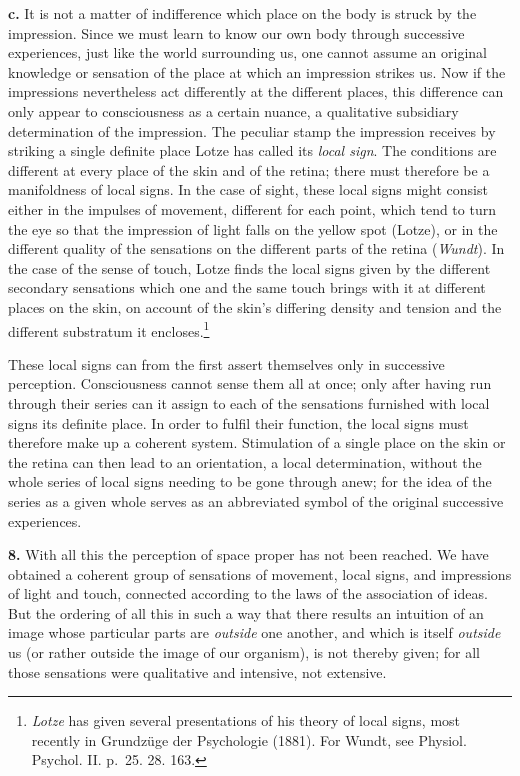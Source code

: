 \documentclass[12pt,a4paper]{book}
\newcommand{\opage}[1]{\marginnote{\footnotesize\textit{[#1]}}}
\begin{document}
\textbf{c.} It is not a matter of indifference which place on the body
is struck by the impression. Since we must learn to know our own body
through successive experiences, just like the world surrounding us, one
cannot assume an original knowledge or sensation of the place at which an
impression strikes us. Now if the impressions nevertheless act
differently at the different places, this difference can only appear to
consciousness as a certain nuance, a qualitative subsidiary determination
of the impression. The peculiar stamp the impression receives by striking
a single definite place Lotze has called its \emph{local sign}. The
conditions are different at every place of the skin and of the retina;
there must therefore be a manifoldness of local signs. In the case of
sight, these local signs might consist either in the impulses of
movement, different for each point, which tend to turn the eye so that
the impression of light falls on the yellow spot (Lotze), or in the
different quality of the sensations on the different parts of the retina
(\emph{Wundt}). In the case of the sense of touch, Lotze finds the local
signs given by the different secondary sensations which one and the same
touch brings with it at different places on the skin, on account of the
skin's differing density and tension and the different substratum it
encloses.\footnote{\emph{Lotze} has given several presentations of his
theory of local signs, most recently in Grundzüge der Psychologie
(1881). For Wundt, see Physiol. Psychol. II. p.~25. 28. 163.}

These local signs can from the first assert themselves only in successive
perception. Consciousness cannot sense them all at once; only after
having run through their series can it assign to each of the sensations
furnished with local signs its definite place. In order to fulfil their
function, the local signs must therefore make up a coherent system.
Stimulation of a single place on the skin
\opage{246}or the retina can then lead to an orientation, a local
determination, without the whole series of local signs needing to be
gone through anew; for the idea of the series as a given whole serves as
an abbreviated symbol of the original successive experiences.

\textbf{8.} With all this the perception of space proper has not been
reached. We have obtained a coherent group of sensations of movement,
local signs, and impressions of light and touch, connected according to
the laws of the association of ideas. But the ordering of all this in
such a way that there results an intuition of an image whose particular
parts are \emph{outside} one another, and which is itself \emph{outside}
us (or rather outside the image of our organism), is not thereby given;
for all those sensations were qualitative and intensive, not extensive.
\end{document}
